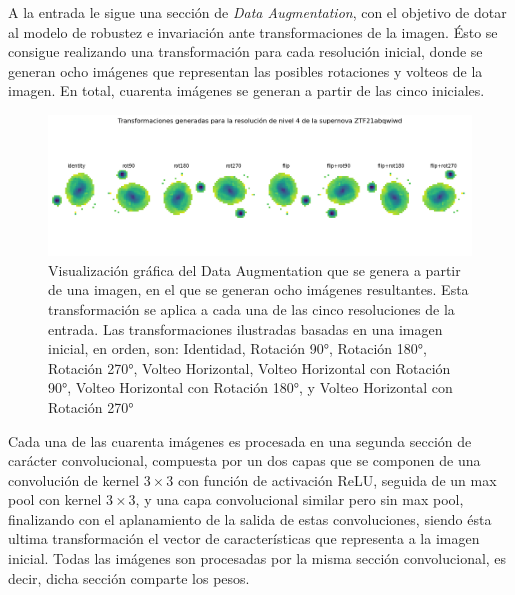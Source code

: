 \documentclass[../tesis.tex]{subfiles}
\begin{document}
A la entrada le sigue una sección de \textit{Data Augmentation}, con el objetivo de dotar al modelo de robustez e invariación ante transformaciones de la imagen. Ésto se consigue realizando una transformación para cada resolución inicial, donde se generan ocho imágenes que representan las posibles rotaciones y volteos de la imagen. En total, cuarenta imágenes se generan a partir de las cinco iniciales.\par\null\par

\begin{figure}[ht!]
    \centering
    \includegraphics[width=1\linewidth]{images/introduction/delight_data_augmentation.png}
    \caption{Visualización gráfica del Data Augmentation que se genera a partir de una imagen, en el que se generan ocho imágenes resultantes. Esta transformación se aplica a cada una de las cinco resoluciones de la entrada. Las transformaciones ilustradas basadas en una imagen inicial, en orden, son: Identidad, Rotación 90°, Rotación 180°, Rotación 270°, Volteo Horizontal, Volteo Horizontal con Rotación 90°, Volteo Horizontal con Rotación 180°, y Volteo Horizontal con Rotación 270° }
    \label{fig:delight-transformation-layer}
\end{figure}

Cada una de las cuarenta imágenes es procesada en una segunda sección de carácter convolucional, compuesta por un dos capas que se componen de una convolución de kernel $3\times3$ con función de activación ReLU, seguida de un max pool con kernel $3\times3$, y una capa convolucional similar pero sin max pool, finalizando con el aplanamiento de la salida de estas convoluciones, siendo ésta ultima transformación el vector de características que representa a la imagen inicial. Todas las imágenes son procesadas por la misma sección convolucional, es decir, dicha sección comparte los pesos.\par\null\par
\end{document}
